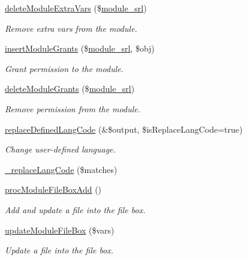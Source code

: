 \begin{DoxyCompactItemize}
\hyperlink{classmoduleController_aff9b45ce153dcad735896f56fe60516f}{delete\-Module\-Extra\-Vars} (\$\hyperlink{ko_8install_8php_a370bb6450fab1da3e0ed9f484a38b761}{module\-\_\-srl})
\begin{DoxyCompactList}\small\item\em Remove extra vars from the module. \end{DoxyCompactList}\item 
\hyperlink{classmoduleController_a551eda7765398673c806ca1def44c7ac}{insert\-Module\-Grants} (\$\hyperlink{ko_8install_8php_a370bb6450fab1da3e0ed9f484a38b761}{module\-\_\-srl}, \$obj)
\begin{DoxyCompactList}\small\item\em Grant permission to the module. \end{DoxyCompactList}\item 
\hyperlink{classmoduleController_a34f1a44321986a8f4692be393d6a5c85}{delete\-Module\-Grants} (\$\hyperlink{ko_8install_8php_a370bb6450fab1da3e0ed9f484a38b761}{module\-\_\-srl})
\begin{DoxyCompactList}\small\item\em Remove permission from the module. \end{DoxyCompactList}\item 
\hyperlink{classmoduleController_ace764298e1aee4006ecd8dbf7aaf4007}{replace\-Defined\-Lang\-Code} (\&\$output, \$is\-Replace\-Lang\-Code=true)
\begin{DoxyCompactList}\small\item\em Change user-\/defined language. \end{DoxyCompactList}\item 
\hyperlink{classmoduleController_a0d4e5ad494cacf50288a3f6e9f013a5d}{\-\_\-replace\-Lang\-Code} (\$matches)
\item 
\hyperlink{classmoduleController_a456022e1fca3a204b9b2b828b501fefb}{proc\-Module\-File\-Box\-Add} ()
\begin{DoxyCompactList}\small\item\em Add and update a file into the file box. \end{DoxyCompactList}\item 
\hyperlink{classmoduleController_af1ea81da50538369f648be26252ddd26}{update\-Module\-File\-Box} (\$vars)
\begin{DoxyCompactList}\small\item\em Update a file into the file box. \end{DoxyCompactList}\item 

\end{DoxyCompactItemize}
